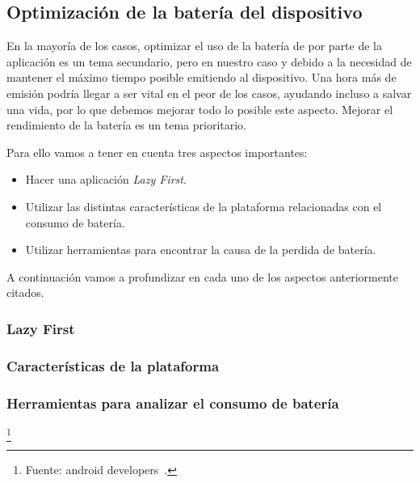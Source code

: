\subsection{Optimización de la batería del dispositivo}

En la mayoría de los casos, optimizar el uso de la batería de por parte 
de la aplicación es un tema secundario, pero en nuestro caso y debido 
a la necesidad de mantener el máximo tiempo posible emitiendo al dispositivo.
 Una hora más de emisión podría llegar a ser vital en el peor de los casos, 
ayudando incluso a salvar una vida, por lo que debemos mejorar todo lo
 posible este aspecto. Mejorar el rendimiento de la batería es un tema prioritario.


Para ello vamos a tener en cuenta tres aspectos importantes:
\begin{itemize}
\item Hacer una aplicación \textit{Lazy First}.
\item Utilizar las distintas características de la plataforma relacionadas
 con el consumo de batería.
\item Utilizar herramientas para encontrar la causa de la perdida de batería.
\end{itemize}

A continuación vamos a profundizar en cada uno de los aspectos 
anteriormente citados.
\subsubsection{Lazy First}

\subsubsection{Características de la plataforma}

\subsubsection{Herramientas para analizar el consumo de batería}

\footnote{Fuente: android developers~\cite{OPTIMIZABATERIA}.}
